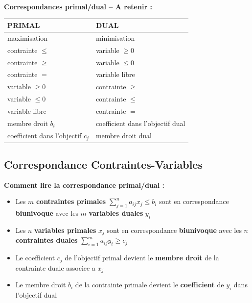 \documentclass[12pt,a4paper]{article}
\begin{document}
\begin{astuce}
\textbf{Correspondances primal/dual -- A retenir :}

\begin{center}
\begin{tabular}{l|l}
\toprule
\textbf{PRIMAL} & \textbf{DUAL} \\
\midrule
maximisation & minimisation \\
contrainte $\leq$ & variable $\geq 0$ \\
contrainte $\geq$ & variable $\leq 0$ \\
contrainte $=$ & variable libre \\
variable $\geq 0$ & contrainte $\geq$ \\
variable $\leq 0$ & contrainte $\leq$ \\
variable libre & contrainte $=$ \\
membre droit $b_i$ & coefficient dans l'objectif dual \\
coefficient dans l'objectif $c_j$ & membre droit dual \\
\bottomrule
\end{tabular}
\end{center}
\end{astuce}

\newpage
\subsection{Correspondance Contraintes-Variables}

\begin{notecours}
\textbf{Comment lire la correspondance primal/dual :}

\begin{itemize}
    \item Les $m$ \textcolor{titrebleu}{\textbf{contraintes primales}} $\sum_{j=1}^n a_{ij}x_j \leq b_i$ sont en correspondance \textbf{biunivoque} avec les $m$ \textcolor{defvert}{\textbf{variables duales}} $y_i$
    \item Les $n$ \textcolor{titrebleu}{\textbf{variables primales}} $x_j$ sont en correspondance \textbf{biunivoque} avec les $n$ \textcolor{defvert}{\textbf{contraintes duales}} $\sum_{i=1}^m a_{ij}y_i \geq c_j$
    \item Le coefficient $c_j$ de l'objectif primal devient le \textcolor{importantrouge}{\textbf{membre droit}} de la contrainte duale associee a $x_j$
    \item Le membre droit $b_i$ de la contrainte primale devient le \textcolor{importantrouge}{\textbf{coefficient}} de $y_i$ dans l'objectif dual
\end{itemize}
\end{notecours}
\end{document}

